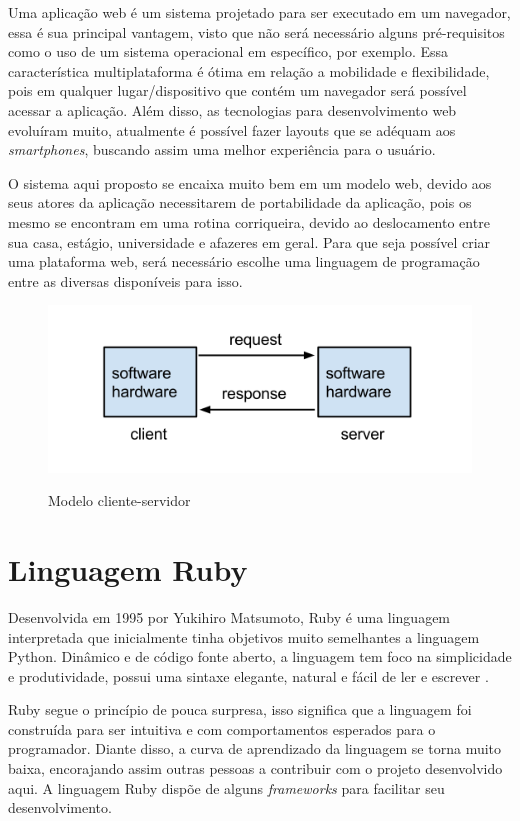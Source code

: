 Uma aplicação web é um sistema projetado para ser executado em um navegador, essa é sua principal vantagem, visto que não será necessário alguns pré-requisitos como o uso de um sistema operacional em específico, por exemplo. Essa característica multiplataforma é ótima em relação a mobilidade e flexibilidade, pois em qualquer lugar/dispositivo que contém um navegador será possível acessar a aplicação. Além disso, as tecnologias para desenvolvimento web evoluíram muito, atualmente é possível fazer layouts que se adéquam aos \textit{smartphones}, buscando assim uma melhor experiência para o usuário\cite{pandey2013responsive}. \par
O sistema aqui proposto se encaixa muito bem em um modelo web, devido aos seus atores da aplicação necessitarem de portabilidade da aplicação, pois os mesmo se encontram em uma rotina corriqueira, devido ao deslocamento entre sua casa, estágio, universidade e afazeres em geral. Para que seja possível criar uma plataforma web, será necessário escolhe uma linguagem de programação entre as diversas disponíveis para isso.

\begin{figure}[htbp!]
  \centering
  \caption{Modelo cliente-servidor}
  \includegraphics[width=1\textwidth]{figs/web.png}
    \label{fig:web}
\end{figure}

\section{Linguagem Ruby}
Desenvolvida em 1995 por Yukihiro Matsumoto, Ruby é uma linguagem interpretada que inicialmente tinha objetivos muito semelhantes a linguagem Python\cite{purer2009phpvspythonvsruby}. Dinâmico e de código fonte aberto, a linguagem tem foco na simplicidade e produtividade, possui uma sintaxe elegante, natural e fácil de ler e escrever \cite{siteruby}. \par
Ruby segue o princípio de pouca surpresa, isso significa que a linguagem foi construída para ser intuitiva e com comportamentos esperados para o programador\cite{purer2009phpvspythonvsruby}. Diante disso, a curva de aprendizado da linguagem se torna muito baixa, encorajando assim outras pessoas a contribuir com o projeto desenvolvido aqui. A linguagem Ruby dispõe de alguns \textit{frameworks} para facilitar seu desenvolvimento.

